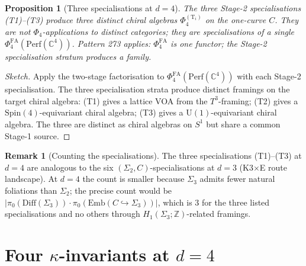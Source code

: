 \documentclass[11pt]{article}
\providecommand{\C}{\mathbb{C}}
\providecommand{\Z}{\mathbb{Z}}
\providecommand{\Perf}{\mathrm{Perf}}
\providecommand{\PhiFA}{\Phi^{\mathrm{FA}}}
\newtheorem{proposition}[theorem]{Proposition}
\theoremstyle{definition}
\newtheorem{remark}[theorem]{Remark}
\begin{document}
\begin{proposition}[Three specialisations at $d = 4$]
\label{prop:spch-d4}
The three Stage-2 specialisations (T1)--(T3) produce three \emph{distinct}
chiral algebras $\Phi_4^{(\mathrm{T}_i)}$ on the one-curve $C$. They are
not $\Phi_4$-applications to distinct categories; they are
specialisations of a single $\PhiFA_4(\Perf(\C^4))$. Pattern 273
applies: $\PhiFA_4$ is \emph{one} functor; the Stage-2 specialisation
stratum produces a family.
\end{proposition}

\begin{proof}[Sketch]
Apply the two-stage factorisation to $\PhiFA_4(\Perf(\C^4))$ with
each Stage-2 specialisation. The three specialisation strata produce
distinct framings on the target chiral algebra:
(T1) gives a lattice VOA from the $T^3$-framing; (T2) gives a
$\mathrm{Spin}(4)$-equivariant chiral algebra; (T3) gives a $\mathrm{U}(1)$-equivariant
chiral algebra. The three are distinct as chiral algebras on $S^1$
but share a common Stage-1 source.
\end{proof}

\begin{remark}[Counting the specialisations]
\label{rem:count-spec-d4}
The three specialisations (T1)--(T3) at $d = 4$ are analogous to the
six $(\Sigma_2, C)$-specialisations at $d = 3$ (K3$\times$E route
landscape). At $d = 4$ the count is smaller because
$\Sigma_3$ admits fewer natural foliations than $\Sigma_2$; the
precise count would be $|\pi_0(\text{Diff}(\Sigma_3)) \cdot \pi_0(\text{Emb}(C \hookrightarrow \Sigma_3))|$,
which is $3$ for the three listed specialisations and no
others through $H_1(\Sigma_3; \Z)$-related framings.
\end{remark}

\section{Four $\kappa$-invariants at $d = 4$}
\label{sec:four-kappa-d4}
\end{document}
